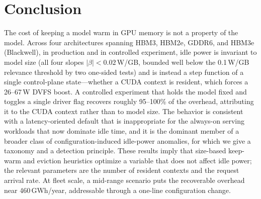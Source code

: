 \documentclass[conference]{IEEEtran}
\begin{document}
\section{Conclusion}
The cost of keeping a model warm in GPU memory is not a property of the model. Across four architectures spanning HBM3, HBM2e, GDDR6, and HBM3e (Blackwell), in production and in controlled experiment, idle power is invariant to model size (all four slopes $|\beta|<0.02$\,W/GB, bounded well below the 0.1\,W/GB relevance threshold by two one-sided tests) and is instead a step function of a single control-plane state---whether a CUDA context is resident, which forces a 26--67\,W DVFS boost. A controlled experiment that holds the model fixed and toggles a single driver flag recovers roughly 95--100\% of the overhead, attributing it to the CUDA context rather than to model size. The behavior is consistent with a latency-oriented default that is inappropriate for the always-on serving workloads that now dominate idle time, and it is the dominant member of a broader class of configuration-induced idle-power anomalies, for which we give a taxonomy and a detection principle. These results imply that size-based keep-warm and eviction heuristics optimize a variable that does not affect idle power; the relevant parameters are the number of resident contexts and the request arrival rate. At fleet scale, a mid-range scenario puts the recoverable overhead near \num{460}\,GWh/year, addressable through a one-line configuration change.
\end{document}
